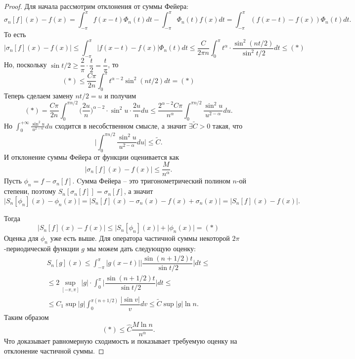 \begin{proof}
    Для начала рассмотрим отклонения от суммы Фейера:
    \[
        \sigma_n[f](x) - f(x) = \int_{-\pi}^\pi f(x - t)\Phi_n(t)dt - \int_{-\pi}^{\pi}\Phi_n(t)f(x)dt = \int_{-\pi}^{\pi} (f(x - t) - f(x))\Phi_n(t)dt.
    \]
    То есть \[
                |\sigma_n[f](x) - f(x)| \leq \int_{-\pi}^{\pi}|f(x - t) - f(x)|\Phi_n(t)dt \leq \dfrac{C}{2\pi n} \int_{0}^{\pi} t^\alpha \cdot \dfrac{\sin^2 (nt/2)}{\sin^2 t/2}dt \leq (*)
    \]
    Но, поскольку $\sin t/2 \geq \dfrac{2}{\pi} \cdot \dfrac{t}{2} = \dfrac{t}{\pi}$, то \[
                                                                                            (*) \leq \dfrac{C\pi}{2n} \int_0^{\pi} t^{\alpha - 2}\sin^2(nt/2)dt = (*)
    \]
    Теперь сделаем замену $nt/2 = u$ и получим \[
                                                   (*) = \dfrac{C \pi}{2 n} \int_0^{\pi n/2} \biggr(\dfrac{2u}{n}\biggr)^{\alpha - 2}\cdot\sin^2 u\cdot \dfrac{2u}{n}du \leq \dfrac{2^{\alpha - 2}C \pi}{n^\alpha}\int_0^{\pi n / 2} \dfrac{\sin^2 u}{u^{2 - \alpha}}du.
    \]
    Но $\int_0^{+\infty}\frac{\sin^2 u}{u^{2 - \alpha}}du$ сходится в несобственном смысле, а значит $\exists \widetilde{C} > 0$ такая, что \[
                                                                                                                                                \biggr|\int_0^{\pi n / 2}\dfrac{\sin^2 u}{u^{2 - \alpha}}du\biggr| \leq \widetilde{C}.
    \]
    И отклонение суммы Фейера от функции оценивается как \[
                                                             |\sigma_n[f](x) - f(x)| \leq \dfrac{M}{n^\alpha}.
    \]
    Пусть $\phi_n = f -\sigma_n[f]$. Cумма Фейера -- это тригонометрический полином $n$-ой степени, поэтому $S_n[\sigma_n[f]] = \sigma_n[f]$, а значит
    \[
    	\big|S_n[\phi_n](x) - \phi_n(x)\big| = \big|S_n[f](x) - \sigma_n(x) - f(x) + \sigma_n(x) \big| = \big|S_n[f](x) - f(x)\big|.
    \]

    Тогда
    \[                                                                           \big|S_n[f](x) - f(x)\big| \leq \big|S_n[\phi_n](x)\big| + \big|\phi_n(x)\big| = (*)
    \]
    Оценка для $\phi_n$ уже есть выше.
    Для оператора частичной суммы некоторой $2\pi$-периодической функции $g$ мы можем дать следующую оценку:
    \begin{multline*}
        S_n[g](x) \leq \int_{-\pi}^{\pi}|g(x - t)|\biggr|\dfrac{\sin (n + 1/2)t}{\sin t/2}\biggr|dt \leq \\ \leq 2\sup\limits_{[-\pi, \pi]}|g| \cdot \int_{0}^\pi \biggr|\dfrac{\sin (n + 1/2)t}{\sin t/2}\biggr| dt \leq \\ \leq C_1 \sup |g| \int_0^{\pi (n + 1/2)} \dfrac{|\sin v|}{v}dv \leq \widetilde{C}\sup|g| \ln n.
    \end{multline*}
    Таким образом \[
                      (*) \leq \widehat{C}\dfrac{M\ln n}{n^\alpha}.
    \]
    Что доказывает равномерную сходимость и показывает требуемую оценку на отклонение частичной суммы.
\end{proof}
